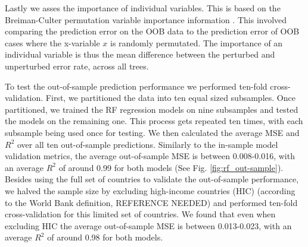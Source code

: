 \documentclass{article}
\begin{document}
Lastly we asses the importance of individual variables. This is based on the Breiman-Culter permutation variable importance information \citep{breiman2001random}.  This involved comparing the prediction error on the OOB data to the prediction error of OOB cases where the x-variable $x$ is randomly permutated.  The importance of an individual variable is thus the mean difference between the perturbed and unperturbed error rate, across all trees. 

To test the out-of-sample prediction performance we performed ten-fold cross-validation. First, we partitioned the data into ten equal sized subsamples. Once partitioned, we trained the RF regression models on nine subsamples and tested the models on the remaining one. This process gets repeated ten times, with each subsample being used once for testing. We then calculated the average MSE and ${R}^2$ over all ten out-of-sample predictions. Similarly to the in-sample model validation metrics, the average out-of-sample MSE is between 0.008-0.016, with an average ${R}^2$ of around 0.99 for both models (See Fig. \ref{fig:rf_out-sample}). Besides using the full set of countries to validate the out-of-sample performance, we halved the sample size by excluding high-income countries (HIC) (according to the World Bank definition, REFERENCE NEEDED) and performed ten-fold cross-validation for this limited set of countries. We found that even when excluding HIC the average out-of-sample MSE is between 0.013-0.023, with an average ${R}^2$ of around 0.98 for both models.
\end{document}
